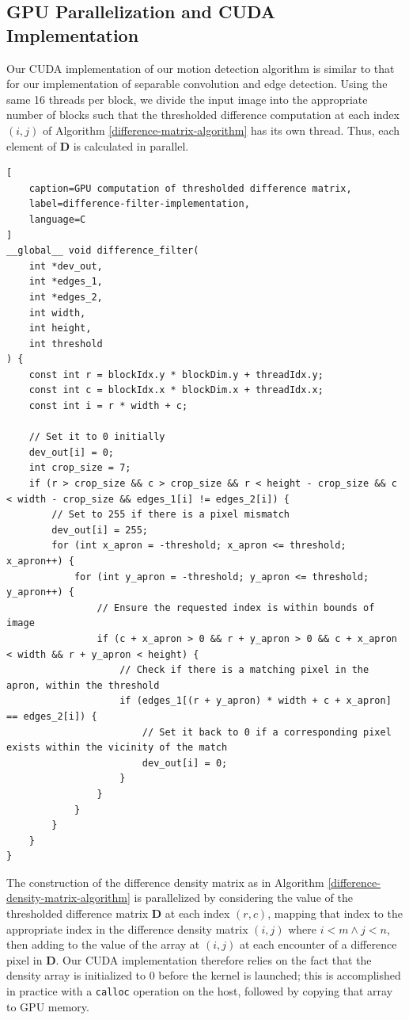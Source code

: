 \documentclass[journal]{IEEEtran}
\begin{document}
\subsection{GPU Parallelization and CUDA Implementation}
Our CUDA implementation of our motion detection algorithm is similar to that for our implementation of separable convolution and edge detection. Using the same 16 threads per block, we divide the input image into the appropriate number of blocks such that the thresholded difference computation at each index $(i, j)$ of Algorithm \ref{difference-matrix-algorithm} has its own thread. Thus, each element of $\boldsymbol{D}$ is calculated in parallel.
\begin{lstlisting}[
	caption=GPU computation of thresholded difference matrix,
	label=difference-filter-implementation,
	language=C
]
__global__ void difference_filter(
	int *dev_out,
	int *edges_1,
	int *edges_2,
	int width,
	int height,
	int threshold
) {
	const int r = blockIdx.y * blockDim.y + threadIdx.y;
	const int c = blockIdx.x * blockDim.x + threadIdx.x;
	const int i = r * width + c;

    // Set it to 0 initially
    dev_out[i] = 0;
    int crop_size = 7;
    if (r > crop_size && c > crop_size && r < height - crop_size && c < width - crop_size && edges_1[i] != edges_2[i]) {
        // Set to 255 if there is a pixel mismatch
        dev_out[i] = 255;
        for (int x_apron = -threshold; x_apron <= threshold; x_apron++) {
            for (int y_apron = -threshold; y_apron <= threshold; y_apron++) {
                // Ensure the requested index is within bounds of image
                if (c + x_apron > 0 && r + y_apron > 0 && c + x_apron < width && r + y_apron < height) {
                    // Check if there is a matching pixel in the apron, within the threshold
                    if (edges_1[(r + y_apron) * width + c + x_apron] == edges_2[i]) {
                        // Set it back to 0 if a corresponding pixel exists within the vicinity of the match
                        dev_out[i] = 0;
                    }
                }
            }
        }
    }
}
\end{lstlisting}
The construction of the difference density matrix as in Algorithm \ref{difference-density-matrix-algorithm} is parallelized by considering the value of the thresholded difference matrix $\boldsymbol{D}$ at each index $(r, c)$, mapping that index to the appropriate index in the difference density matrix $(i, j)$ where $i < m \wedge j < n$, then adding to the value of the array at $(i, j)$ at each encounter of a difference pixel in $\boldsymbol{D}$. Our CUDA implementation therefore relies on the fact that the density array is initialized to 0 before the kernel is launched; this is accomplished in practice with a \texttt{calloc} operation on the host, followed by copying that array to GPU memory.
\end{document}
